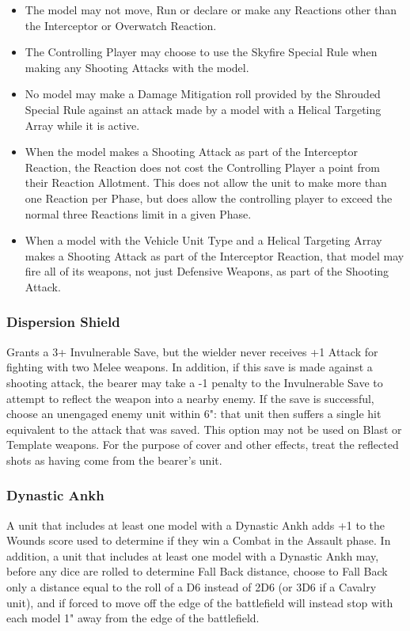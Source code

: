 \begin{itemize}
	\item The model may not move, Run or declare or make any Reactions other than the Interceptor or Overwatch Reaction.
	\item The Controlling Player may choose to use the Skyfire Special Rule when making any Shooting Attacks with the model.
	\item No model may make a Damage Mitigation roll provided by the Shrouded Special Rule against an attack made by a model with a Helical Targeting Array while it is active.
	\item When the model makes a Shooting Attack as part of the Interceptor Reaction, the Reaction does not cost the Controlling Player a point from their Reaction Allotment. This does not allow the unit to make more than one Reaction per Phase, but does allow the controlling player to exceed the normal three Reactions limit in a given Phase.
	\item When a model with the Vehicle Unit Type and a Helical Targeting Array makes a Shooting Attack as part of the Interceptor Reaction, that model may fire all of its weapons, not just Defensive Weapons, as part of the Shooting Attack.
\end{itemize}

\subsubsection{Dispersion Shield} \label{Dispersion Shield}

Grants a 3+ Invulnerable Save, but the wielder never receives +1 Attack for fighting with two Melee weapons. In addition, if this save is made against a shooting attack, the bearer may take a -1 penalty to the Invulnerable Save to attempt to reflect the weapon into a nearby enemy. If the save is successful, choose an unengaged enemy unit within 6": that unit then suffers a single hit equivalent to the attack that was saved. This option may not be used on Blast or Template weapons. For the purpose of cover and other effects, treat the reflected shots as having come from the bearer's unit.

\subsubsection{Dynastic Ankh} \label{Dynastic Ankh}

A unit that includes at least one model with a Dynastic Ankh adds +1 to the Wounds score used to determine if they win a Combat in the Assault phase. In addition, a unit that includes at least one model with a Dynastic Ankh may, before any dice are rolled to determine Fall Back distance, choose to Fall Back only a distance equal to the roll of a D6 instead of 2D6 (or 3D6 if a Cavalry unit), and if forced to move off the edge of the battlefield will instead stop with each model 1" away from the edge of the battlefield.

